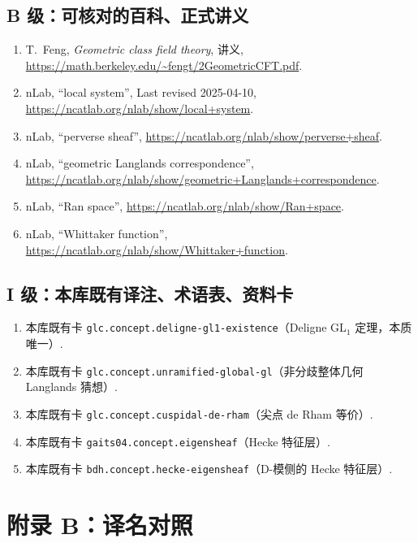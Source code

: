\subsection*{B 级：可核对的百科、正式讲义}
\begin{enumerate}
\item T.~Feng, \emph{Geometric class field theory}, 讲义,
\url{https://math.berkeley.edu/~fengt/2GeometricCFT.pdf}.
\item nLab, ``local system'', Last revised 2025-04-10,
\url{https://ncatlab.org/nlab/show/local+system}.
\item nLab, ``perverse sheaf'', \url{https://ncatlab.org/nlab/show/perverse+sheaf}.
\item nLab, ``geometric Langlands correspondence'',
\url{https://ncatlab.org/nlab/show/geometric+Langlands+correspondence}.
\item nLab, ``Ran space'', \url{https://ncatlab.org/nlab/show/Ran+space}.
\item nLab, ``Whittaker function'', \url{https://ncatlab.org/nlab/show/Whittaker+function}.
\end{enumerate}

\subsection*{I 级：本库既有译注、术语表、资料卡}
\begin{enumerate}
\item 本库既有卡 \texttt{glc.concept.deligne-gl1-existence}（Deligne GL\(_1\) 定理，本质唯一）.
\item 本库既有卡 \texttt{glc.concept.unramified-global-gl}（非分歧整体几何 Langlands 猜想）.
\item 本库既有卡 \texttt{glc.concept.cuspidal-de-rham}（尖点 de Rham 等价）.
\item 本库既有卡 \texttt{gaits04.concept.eigensheaf}（Hecke 特征层）.
\item 本库既有卡 \texttt{bdh.concept.hecke-eigensheaf}（D-模侧的 Hecke 特征层）.
\end{enumerate}

\section*{附录 B：译名对照}

